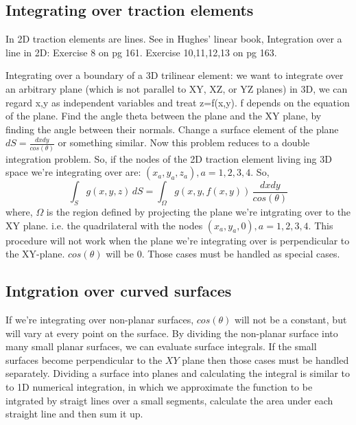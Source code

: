 \documentclass{article}
\newcommand{\beq}{\begin{equation}}
\newcommand{\eeq}{\end{equation}}
\begin{document}
\subsection{Integrating over traction elements}
In 2D traction elements are lines. See in Hughes' linear book, Integration over a line in 2D: Exercise 8 on pg 161. Exercise 10,11,12,13 on pg 163.

Integrating over a boundary of a 3D trilinear element: we want to integrate over an arbitrary plane (which is not parallel to XY, XZ, or YZ planes) in 3D, we can regard x,y as independent variables and treat z=f(x,y). f depends on the equation of the plane.  Find the angle theta between the plane and the XY plane, by finding the angle between their normals. Change a surface element of the plane $dS=\frac{dxdy}{cos(\theta)}$ or something similar. Now this problem reduces to a double integration problem. So, if the nodes of the 2D traction element living ing 3D space we're integrating over are: $(x_a,y_a,z_a), a=1,2,3,4$. So,
\beq
\int_{S}g(x,y,z)\,dS = \int_{\Omega} g(x,y,f(x,y))\,\frac{dxdy}{cos(\theta)}
\eeq
where, $\Omega$ is the region defined by projecting the plane we're intgrating over to the XY plane. i.e. the quadrilateral with the nodes $(x_a,y_a,0), a=1,2,3,4$. This procedure will not work when the plane we're integrating over is perpendicular to the XY-plane. $cos(\theta)$ will be $0$. Those cases must be handled as special cases.
\subsection{Intgration over curved surfaces}
If we're integrating over non-planar surfaces, $cos(\theta)$ will not be a constant, but will vary at every point on the surface. By dividing the non-planar surface into many small planar surfaces, we can evaluate surface integrals. If the small surfaces become perpendicular to the $XY$ plane then those cases must be handled separately. Dividing a surface into planes and calculating the integral is similar to to 1D numerical integration, in which we approximate the function to be intgrated by straigt lines over a small segments, calculate the area under each straight line and then sum it up.
\end{document}
